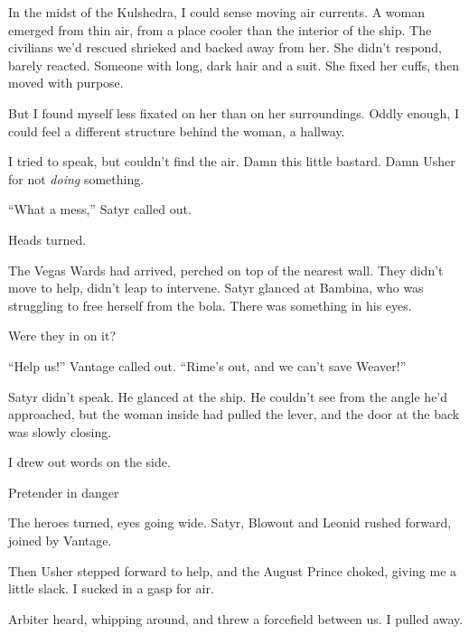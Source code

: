 In the midst of the Kulshedra, I could sense moving air currents.  A woman emerged from thin air, from a place cooler than the interior of the ship.  The civilians we'd rescued shrieked and backed away from her.  She didn't respond, barely reacted.  Someone with long, dark hair and a suit.  She fixed her cuffs, then moved with purpose.



But I found myself less fixated on her than on her surroundings.  Oddly enough, I could feel a different structure behind the woman, a hallway.



I tried to speak, but couldn't find the air.  Damn this little bastard.  Damn Usher for not \emph{doing} something.



``What a mess,'' Satyr called out.



Heads turned.



The Vegas Wards had arrived, perched on top of the nearest wall.  They didn't move to help, didn't leap to intervene.  Satyr glanced at Bambina, who was struggling to free herself from the bola.  There was something in his eyes.



Were they in on it?



``Help us!'' Vantage called out.  ``Rime's out, and we can't save Weaver!''



Satyr didn't speak.  He glanced at the ship.  He couldn't see from the angle he'd approached, but the woman inside had pulled the lever, and the door at the back was slowly closing.



I drew out words on the side.



Pretender in danger



The heroes turned, eyes going wide.  Satyr, Blowout and Leonid rushed forward, joined by Vantage.



Then Usher stepped forward to help, and the August Prince choked, giving me a little slack.  I sucked in a gasp for air.



Arbiter heard, whipping around, and threw a forcefield between us.  I pulled away.




